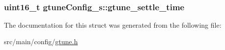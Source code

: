 \hypertarget{structgtuneConfig__s_a6214b68b8fc067f0f02ddf5558255dcc}{
\subsubsection[{gtune\+\_\+settle\+\_\+time}]{\setlength{\rightskip}{0pt plus 5cm}uint16\+\_\+t gtune\+Config\+\_\+s\+::gtune\+\_\+settle\+\_\+time}}\label{structgtuneConfig__s_a6214b68b8fc067f0f02ddf5558255dcc}


The documentation for this struct was generated from the following file\+:\begin{DoxyCompactItemize}
\item 
src/main/config/\hyperlink{config_2gtune_8h}{gtune.\+h}\end{DoxyCompactItemize}
